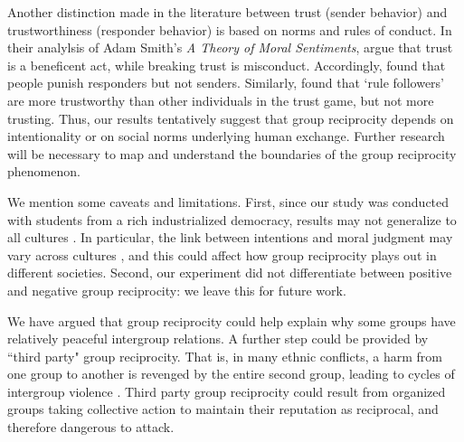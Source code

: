 \documentclass[12pt,a4paper]{article}\usepackage[]{graphicx}\usepackage[]{color}
\begin{document}
Another distinction made in the literature between trust (sender behavior) and trustworthiness (responder behavior) is based on norms and rules of conduct. In their analylsis of Adam Smith's \emph{A Theory of Moral Sentiments}, \citet{wilson2017sentiments} argue that trust is a beneficent act, while breaking trust is misconduct. Accordingly, \citet{wilson2017sentiments} found that people punish responders but not senders. Similarly, \citet{kimbrough2015norms} found that `rule followers' are more trustworthy than other individuals in the trust game, but not more trusting. 
Thus, our results tentatively suggest that group reciprocity depends on intentionality or on social norms underlying human exchange. Further research will be necessary to map and understand the boundaries of the group reciprocity phenomenon.

We mention some caveats and limitations.
First, since our study was conducted with students from a rich industrialized democracy, results may not generalize to all cultures \citep{henrich2010most}. In particular, the link between intentions and moral judgment may vary across cultures \citep{barrett2016small}, and this could affect how group reciprocity plays out in different societies. Second, our experiment did not differentiate between positive and
negative group reciprocity: we leave this for future work. 


We have argued that group reciprocity could help explain why some groups have relatively peaceful 
intergroup relations.  A further step could be provided by ``third party" group reciprocity. That 
is, in many ethnic conflicts, a harm from one group to another is revenged by the entire second group, leading to 
cycles of intergroup violence \citep{fearon1996explaining}. Third party group reciprocity could result from 
organized groups taking collective action to maintain their reputation as reciprocal, and therefore dangerous to attack.
\end{document}
